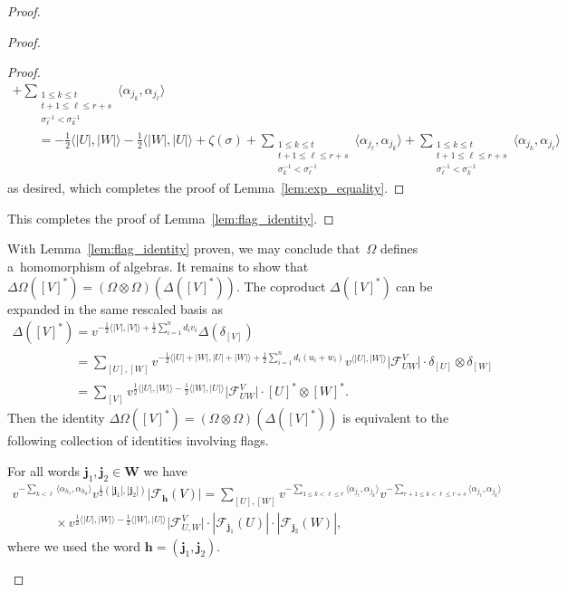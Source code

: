 \begin{proof}
\begin{proof}
\begin{proof}
\begin{gather*}
+\sum\limits_{\substack{1\le k\le t\\t+1\le\ell\le r+s\\ \sigma_\ell^{-1}<\sigma_k^{-1}}}\langle\alpha_{j_k},\alpha_{j_\ell}\rangle
\\
\qquad
=-\frac{1}{2}\langle |U|,|W|\rangle-\frac{1}{2}\langle |W|,|U|\rangle+\zeta(\sigma)
+\sum\limits_{\substack{1\le k\le t\\t+1\le\ell\le r+s\\ \sigma_k^{-1}<\sigma_\ell^{-1}}}\langle\alpha_{j_\ell},\alpha_{j_k}\rangle
+\sum\limits_{\substack{1\le k\le t\\t+1\le\ell\le r+s\\ \sigma_\ell^{-1}<\sigma_k^{-1}}}\langle\alpha_{j_k},\alpha_{j_\ell}\rangle
\end{gather*}
as desired, which completes the proof of Lemma~\ref{lem:exp_equality}.
\end{proof}

This completes the proof of Lemma~\ref{lem:flag_identity}.
\end{proof}

With Lemma~\ref{lem:flag_identity} proven, we may conclude that~$\Omega$ def\/ines a~homomorphism of algebras.
It remains to show that $\Delta\Omega([V]^*)=(\Omega\otimes\Omega)(\Delta([V]^*))$.
The coproduct $\Delta([V]^*)$ can be expanded in the same rescaled basis as
\begin{gather*}
\Delta([V]^*)=v^{-\frac{1}{2}\langle |V|,|V|\rangle+\frac{1}{2}\sum\limits_{i=1}^n d_iv_i}\Delta(\delta_{[V]})
\\
\phantom{\Delta([V]^*)}
 =\sum\limits_{[U],[W]}v^{-\frac{1}{2}\langle |U|+|W|,|U|+|W|\rangle+\frac{1}{2}\sum\limits_{i=1}^n
d_i(u_i+w_i)}v^{\langle|U|,|W|\rangle}\big|\mathcal{F}^V_{UW}\big|\cdot \delta_{[U]}\otimes\delta_{[W]}
\\
\phantom{\Delta([V]^*)}
 =\sum\limits_{[V]}v^{\frac{1}{2}\langle |U|,|W|\rangle-\frac{1}{2}\langle |W|,|U|\rangle} \big|\mathcal{F}^V_{UW}\big|\cdot
[U]^*\otimes[W]^*.
\end{gather*}
Then the identity $\Delta\Omega([V]^*)=(\Omega\otimes\Omega)(\Delta([V]^*))$ is equivalent to the following collection
of identities involving f\/lags.
\begin{Lemma}
For all words $\mathbf{j}_1,\mathbf{j}_2\in\mathbf{W}$ we have
\begin{gather*}
 v^{-\sum\limits_{k<\ell}\langle
\alpha_{h_\ell},\alpha_{h_k}\rangle}v^{\frac{1}{2}(|\mathbf{j}_1|,|\mathbf{j}_2|)}|\mathcal{F}_\mathbf{h}(V)|
 =\sum\limits_{[U],[W]}v^{-\sum\limits_{1\le k<\ell\le r}\langle\alpha_{j_\ell},\alpha_{j_k}\rangle}
v^{-\sum\limits_{r+1\le k<\ell\le r+s}\langle\alpha_{j_\ell},\alpha_{j_k}\rangle}
\\
\qquad
\phantom{=}{}
\times
v^{\frac{1}{2}\langle|U|,|W|\rangle-\frac{1}{2}\langle|W|,|U|\rangle}
\big|\mathcal{F}_{U,W}^V\big|\cdot|\mathcal{F}_{\mathbf{j}_1}(U)|\cdot|\mathcal{F}_{\mathbf{j}_2}(W)|,
\end{gather*}
where we used the word $\mathbf{h}=(\mathbf{j}_1,\mathbf{j}_2)$.
\end{Lemma}


\end{proof}
